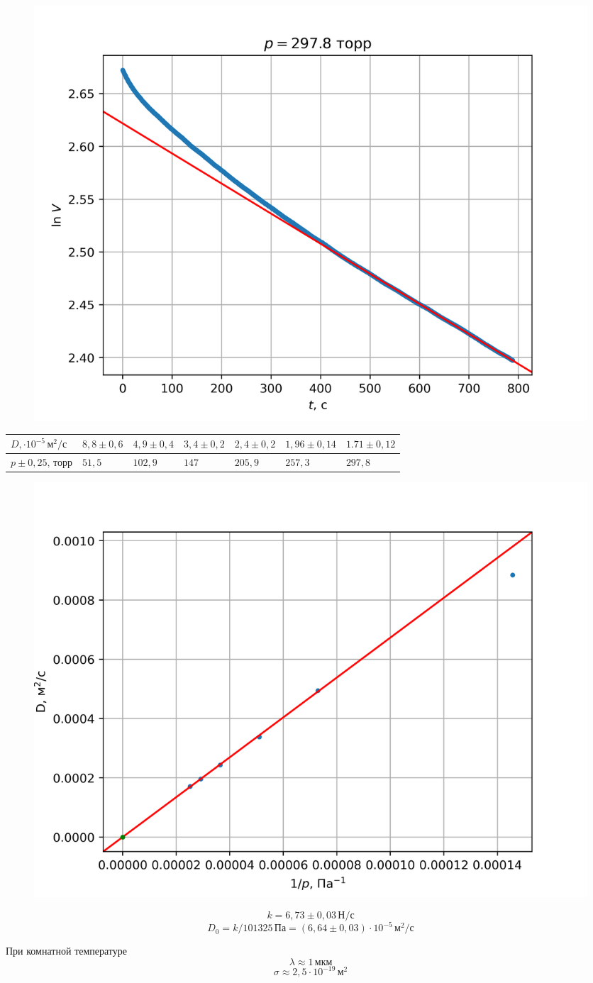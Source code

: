 \begin{figure}
    \centering\includegraphics[width=0.45\linewidth]{img/data6.png}
\end{figure}

\begin{table}[]
    \begin{tabular}{|l|l|l|l|l|l|l|}
    \hline
    $D,\cdot 10^{-5}\,\text{м}^2/\text{с}$ & $8{,}8\pm 0{,}6$ & $4{,}9\pm 0{,}4$ & $3{,}4\pm 0{,}2$ & $2{,}4 \pm 0{,}2$ & $1{,}96\pm 0{,}14$ & $1.71\pm 0{,}12$ \\ \hline
    $p\pm 0{,}25,\,\text{торр}$            & $51{,}5$         & $102{,}9$        & $147$            & $205{,}9$         & $257{,}3$          & $297{,}8$        \\ \hline
    \end{tabular}
\end{table}

\begin{figure}
    \centering\includegraphics[width=0.8\linewidth]{img/total.png}
\end{figure}

\[k = 6{,}73\pm 0{,}03\,\text{Н}/\text{с}\]
\[D_0 = k / 101325\,\text{Па} = \left(6{,}64\pm 0{,}03\right)\cdot 10^{-5}\,\text{м}^2/\text{с}\]

При комнатной температуре
\[\lambda\approx 1\,\text{мкм}\]
\[\sigma\approx 2{,}5\cdot 10^{-19}\,\text{м}^2\]
